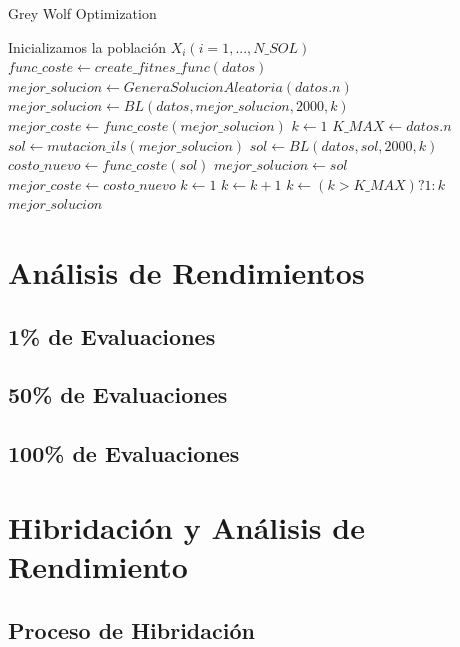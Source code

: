 \documentclass[a4paper, 12.5pt]{report}
\begin{document}
\begin{algorithm}[H]
	\caption{Grey Wolf Optimization}\label{alg:GWO}
	\begin{algorithmic}[1]
		\State Inicializamos la población $X_i (i=1,...,N\_SOL)$
		\State $func\_coste \gets create\_fitnes\_func(datos)$
		\State $mejor\_solucion \gets GeneraSolucionAleatoria(datos.n)$
		\State $mejor\_solucion \gets BL(datos, mejor\_solucion, 2000, k)$ 
		\State $mejor\_coste \gets func\_coste(mejor\_solucion)$
		\State $k \gets 1$
		\State $K\_MAX \gets datos.n$
			\State $sol \gets mutacion\_ils(mejor\_solucion)$
			\State $sol \gets BL(datos, sol, 2000, k)$
			\State $costo\_nuevo \gets func\_coste(sol)$
				\State $mejor\_solucion \gets sol$
				\State $mejor\_coste \gets costo\_nuevo$
				\State $k \gets 1$
			\Else
				\State $k \gets k + 1$
			\EndIf
			\State $k \gets (k > K\_MAX) ? 1 : k$
		\EndFor
		\Return $mejor\_solucion$
	\EndFunction


	\end{algorithmic}
	\end{algorithm}



\section{Análisis de Rendimientos}

\subsection{1\% de Evaluaciones}

\subsection{50\% de Evaluaciones}

\subsection{100\% de Evaluaciones}


\section{Hibridación y Análisis de Rendimiento}


\subsection{Proceso de Hibridación}
\end{document}
